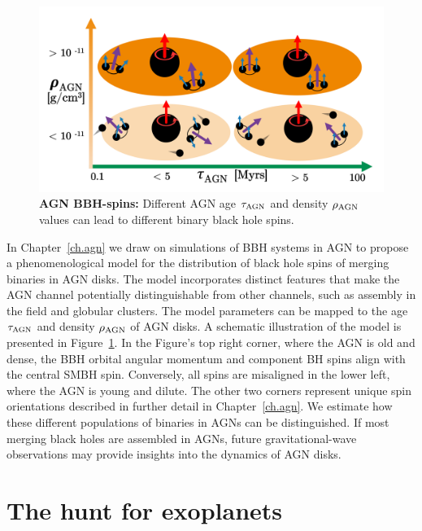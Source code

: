 \begin{figure}
\begin{center}
  \centerline{\includegraphics[width=1.\linewidth]{src/figures/agn_spins.png}}
  \caption{\textbf{AGN BBH-spins:} Different AGN age $\tau_{\rm AGN}$ and density $\rho_{\rm AGN}$ values can lead to different binary black hole spins. }
  \label{fig:agn_spins}
\end{center}
\end{figure}


In Chapter~\ref{ch.agn} we draw on simulations of BBH systems in AGN to propose a phenomenological model for the distribution of black hole spins of merging binaries in AGN disks. 
The model incorporates distinct features that make the AGN channel potentially distinguishable from other channels, such as assembly in the field and globular clusters. 
The model parameters can be mapped to the age $\tau_{\rm AGN}$ and density $\rho_{\rm AGN}$ of AGN disks. 
A schematic illustration of the model is presented in Figure~\ref{fig:agn_spins}. 
In the Figure's top right corner, where the AGN is old and dense, the BBH orbital angular momentum and component BH spins align with the central SMBH spin. 
Conversely, all spins are misaligned in the lower left, where the AGN is young and dilute. The other two corners represent unique spin orientations described in further detail in Chapter~\ref{ch.agn}.
We estimate how these different populations of binaries in AGNs can be distinguished.
If most merging black holes are assembled in AGNs, future gravitational-wave observations may provide insights into the dynamics of AGN disks.

\section{The hunt for exoplanets}

